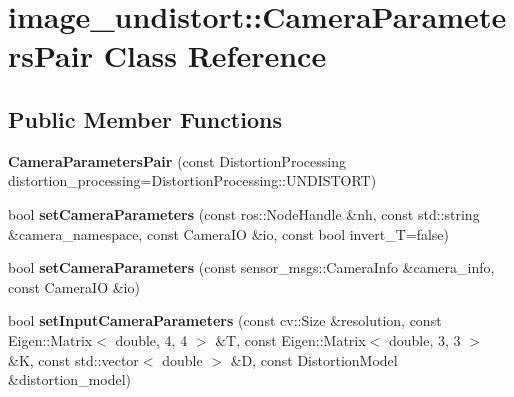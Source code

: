 \hypertarget{classimage__undistort_1_1CameraParametersPair}{}\section{image\+\_\+undistort\+:\+:Camera\+Parameters\+Pair Class Reference}
\label{classimage__undistort_1_1CameraParametersPair}
\subsection*{Public Member Functions}
\begin{DoxyCompactItemize}
\item 
\mbox{\label{classimage__undistort_1_1CameraParametersPair_ad4261cd5f63ee7f798bfce0e348e9070}} 
{\bfseries Camera\+Parameters\+Pair} (const Distortion\+Processing distortion\+\_\+processing=Distortion\+Processing\+::\+U\+N\+D\+I\+S\+T\+O\+RT)
\item 
\mbox{\label{classimage__undistort_1_1CameraParametersPair_ae80f2f5b17cceb4c2584578bc1045ea1}} 
bool {\bfseries set\+Camera\+Parameters} (const ros\+::\+Node\+Handle \&nh, const std\+::string \&camera\+\_\+namespace, const Camera\+IO \&io, const bool invert\+\_\+T=false)
\item 
\mbox{\label{classimage__undistort_1_1CameraParametersPair_a1984650bd098e6081d45f68ac59fcacb}} 
bool {\bfseries set\+Camera\+Parameters} (const sensor\+\_\+msgs\+::\+Camera\+Info \&camera\+\_\+info, const Camera\+IO \&io)
\item 
\mbox{\label{classimage__undistort_1_1CameraParametersPair_a3f7b17993f586f0a3862b48622f5e274}} 
bool {\bfseries set\+Input\+Camera\+Parameters} (const cv\+::\+Size \&resolution, const Eigen\+::\+Matrix$<$ double, 4, 4 $>$ \&T, const Eigen\+::\+Matrix$<$ double, 3, 3 $>$ \&K, const std\+::vector$<$ double $>$ \&D, const Distortion\+Model \&distortion\+\_\+model)
\item 
\mbox{\label{classimage__undistort_1_1CameraParametersPair_a69fbca3593a0dca84fa098cfbb767f78}} 

\end{DoxyCompactItemize}
